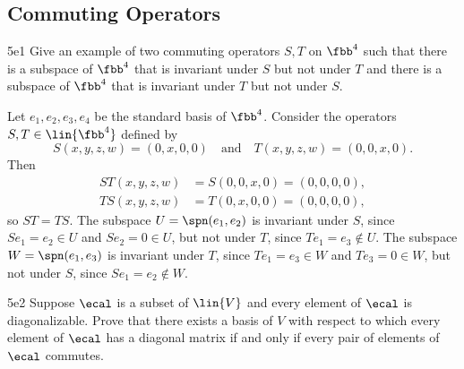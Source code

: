 \subsection{Commuting Operators}

\begin{exercise}{5e1}
    Give an example of two commuting operators $S, T$ on $\fbb^4$ such that there is a subspace of $\fbb^4$ that is invariant under $S$ but not under $T$ and there is a subspace of $\fbb^4$ that is invariant under $T$ but not under $S$.
\end{exercise}

\begin{sol}
    Let $e_1, e_2, e_3, e_4$ be the standard basis of $\fbb^4$.
    Consider the operators $S, T \in \lin{\fbb^4}$ defined by
    \[
        S(x, y, z, w) = (0, x, 0, 0) \quad \text{and} \quad T(x, y, z, w) = (0, 0, x, 0).
    \]
    Then
    \begin{align*}
        ST(x, y, z, w) &= S(0, 0, x, 0) = (0, 0, 0, 0), \\
        TS(x, y, z, w) &= T(0, x, 0, 0) = (0, 0, 0, 0),
    \end{align*}
    so $ST = TS$.
    The subspace $U = \spn(e_1, e_2)$ is invariant under $S$, since $Se_1 = e_2 \in U$ and $Se_2 = 0 \in U$, but not under $T$, since $Te_1 = e_3 \notin U$.
    The subspace $W = \spn(e_1, e_3)$ is invariant under $T$, since $Te_1 = e_3 \in W$ and $Te_3 = 0 \in W$, but not under $S$, since $Se_1 = e_2 \notin W$.
\end{sol}

\begin{exercise}{5e2}
    Suppose $\ecal$ is a subset of $\lin{V}$ and every element of $\ecal$ is diagonalizable.
    Prove that there exists a basis of $V$ with respect to which every element of $\ecal$ has a diagonal matrix if and only if every pair of elements of $\ecal$ commutes.
    
\end{exercise}

